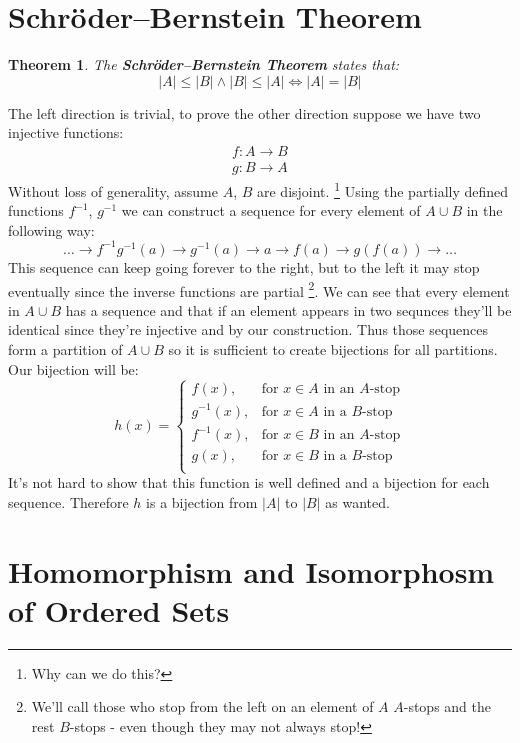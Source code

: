 \documentclass{article}
\theoremstyle{plain}
\newtheorem{theorem}{Theorem}[section]
\begin{document}
\section{Schröder–Bernstein Theorem}
\begin{theorem}
The \textbf{Schröder–Bernstein Theorem} states that:
\[
	|A| \le |B| \land |B| \le |A| \iff |A| = |B|
\]
\end{theorem}
\noindent The left direction is trivial, to prove the other direction
suppose we have two injective functions:
\begin{align*}
f \colon A \rightarrow B \\
g \colon B \rightarrow A
\end{align*}
Without loss of generality, assume $A$, $B$ are disjoint.
\footnote{Why can we do this?}
Using the partially defined functions $f^{-1}$, $g^{-1}$ we can construct 
a sequence for every element of $A \cup B$ in the following way:
\[
	\ldots \to f^{-1}g^{-1}(a) \to g^{-1}(a) 
	\to a \to f(a) \to g(f(a)) \to \ldots
\]
This sequence can keep going forever to the right, but to the left it 
may stop eventually since the inverse functions are partial
\footnote{We'll call those who stop from the left on an element 
of $A$ $A$-stops and the rest $B$-stops - even though they may not 
always stop!}. 
We can see that every element in $A \cup B$ has a sequence and that 
if an element appears in two sequnces they'll be identical since 
they're injective and by our construction. Thus those sequences form 
a partition of $A \cup B$ so it is sufficient to create bijections 
for all partitions. Our bijection will be:
\[
    h(x) = \begin{cases}
        f(x), & \text{for } x\in A\text{ in an $A$-stop}\\
        g^{-1}(x), & \text{for } x\in A\text{ in a $B$-stop}\\
        f^{-1}(x), & \text{for } x\in B\text{ in an $A$-stop}\\
        g(x), & \text{for } x\in B\text{ in a $B$-stop}\\
        \end{cases}
\]
It's not hard to show that this function is well defined and a bijection
for each sequence. Therefore $h$ is a bijection from $|A|$ to $|B|$ as wanted.

\newpage

\section{Homomorphism and Isomorphosm of Ordered Sets}
\end{document}
